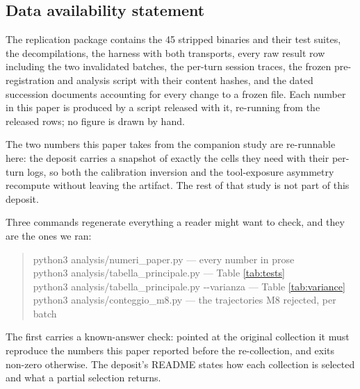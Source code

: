 \subsection*{Data availability statement}

\label{sec:artifact}

The replication package contains the 45 stripped binaries and their test suites, the decompilations, the
harness with both transports, every raw result row including the two invalidated batches, the per-turn
session traces, the frozen pre-registration and analysis script with their content hashes, and the dated
succession documents accounting for every change to a frozen file. Each number in this paper is produced
by a script released with it, re-running from the released rows; no figure is drawn by hand.

The two numbers this paper takes from the companion study are re-runnable here: the deposit carries a
snapshot of exactly the cells they need with their per-turn logs, so both the calibration inversion and the
tool-exposure asymmetry recompute without leaving the artifact. The rest of that study is not part of
this deposit.

Three commands regenerate everything a reader might want to check, and they are the ones we ran:

\begin{quote}\footnotesize\ttfamily\raggedright
python3 analysis/numeri\_paper.py \textrm{--- every number in prose}\\
python3 analysis/tabella\_principale.py \textrm{--- Table \ref{tab:tests}}\\
python3 analysis/tabella\_principale.py -{}-varianza \textrm{--- Table \ref{tab:variance}}\\
python3 analysis/conteggio\_m8.py \textrm{--- the trajectories M8 rejected, per batch}
\end{quote}

\noindent
The first carries a known-answer check: pointed at the original collection it must reproduce the numbers
this paper reported before the re-collection, and exits non-zero otherwise. The deposit's README states
how each collection is selected and what a partial selection returns.

